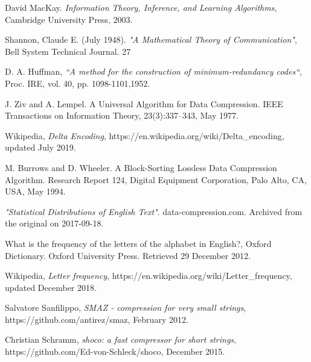 \documentclass[]{article}
\begin{document}
\begin{thebibliography}{1}

	 David MacKay. {\em Information Theory, Inference, and Learning Algorithms}, Cambridge University Press, 2003.

	 Shannon, Claude E. (July 1948). {\em"A Mathematical Theory of Communication"}, Bell System Technical Journal. 27
 
	 D. A. Huffman, {\em“A method for the construction of minimum-redundancy codes“}, Proc. IRE, vol. 40, pp. 1098-1101,1952.
 
 	 J. Ziv and A. Lempel. A Universal Algorithm for Data Compression. IEEE Transactions on Information Theory, 23(3):337–343, May 1977.
 
  	 Wikipedia, {\em Delta Encoding}, https://en.wikipedia.org/wiki/Delta\_encoding, updated July 2019.
 
	 M. Burrows and D. Wheeler. A Block-Sorting Lossless Data Compression Algorithm. Research Report 124, Digital Equipment Corporation, Palo Alto, CA, USA, May 1994.

	 {\em "Statistical Distributions of English Text"}. data-compression.com. Archived from the original on 2017-09-18.

 	 What is the frequency of the letters of the alphabet in English?, Oxford Dictionary. Oxford University Press. Retrieved 29 December 2012.

	 Wikipedia, {\em Letter frequency}, https://en.wikipedia.org/wiki/Letter\_frequency, updated December 2018.

 	 Salvatore Sanfilippo, {\em SMAZ - compression for very small strings}, https://github.com/antirez/smaz, February 2012.

 	 Christian Schramm, {\em shoco: a fast compressor for short strings}, https://github.com/Ed-von-Schleck/shoco, December 2015.

\end{thebibliography}
\end{document}
